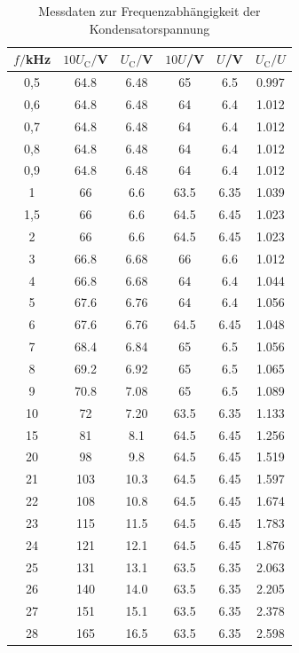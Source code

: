 \begin{table}
\centering
\caption{Messdaten zur Frequenzabhängigkeit der Kondensatorspannung}
\label{tab:amplitude1}
\begin{tabular}{c c c c c c}
\toprule
$f/$kHz & $10U_\mathrm{C}/$V & $U_\mathrm{C}/$V & $10U$/V & $U$/V & $U_\mathrm{C}/U$ \\
\midrule
  0,5	&  64.8  &  6.48 & 65   & 6.5 & 0.997 \\
  0,6	&  64.8  &  6.48 & 64   & 6.4 & 1.012 \\
  0,7	&  64.8  &  6.48 & 64   & 6.4 & 1.012 \\
  0,8	&  64.8  &  6.48 & 64   & 6.4 & 1.012 \\
  0,9	&  64.8  &  6.48 & 64   & 6.4 & 1.012 \\
  1	  &  66	   &  6.6  & 63.5 & 6.35& 1.039 \\
  1,5	&  66	   &  6.6  & 64.5 & 6.45& 1.023 \\
  2	  &  66	   &  6.6  & 64.5 & 6.45& 1.023 \\
  3	  &  66.8	 &  6.68 & 66   & 6.6 & 1.012 \\
  4	  &  66.8	 &  6.68 & 64   & 6.4 & 1.044 \\
  5	  &  67.6	 &  6.76 & 64   & 6.4 & 1.056 \\
  6	  &  67.6	 &  6.76 & 64.5 & 6.45& 1.048 \\
  7	  &  68.4	 &  6.84 & 65   & 6.5 & 1.056 \\
  8	  &  69.2	 &  6.92 & 65   & 6.5 & 1.065 \\
  9	  &  70.8	 &  7.08 & 65   & 6.5 & 1.089 \\
 10	  &  72	   &  7.20 & 63.5 & 6.35& 1.133 \\
 15	  &  81	   &  8.1  & 64.5 & 6.45& 1.256 \\
 20	  &  98	   &  9.8  & 64.5 & 6.45& 1.519 \\
 21	  & 103	   & 10.3  & 64.5 & 6.45& 1.597 \\
 22	  & 108	   & 10.8  & 64.5 & 6.45& 1.674 \\
 23	  & 115	   & 11.5  & 64.5 & 6.45& 1.783 \\
 24	  & 121	   & 12.1  & 64.5 & 6.45& 1.876 \\
 25	  & 131	   & 13.1  & 63.5 & 6.35& 2.063 \\
 26	  & 140	   & 14.0  & 63.5 & 6.35& 2.205 \\
 27	  & 151	   & 15.1  & 63.5 & 6.35& 2.378 \\
 28	  & 165	   & 16.5  & 63.5 & 6.35& 2.598 \\

\end{tabular}
\end{table}
